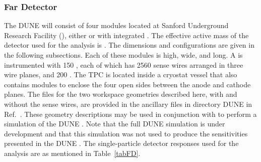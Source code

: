 \subsubsection{Far Detector}
The DUNE %
 will consist of four \nominalmodsize \lartpc modules located at Sanford Underground Research Facility (\surf), %
either  or  with integrated  .  
The effective active mass of the detector used for the analysis is \fdfiducialmass. The  dimensions and   configurations are given in the following subsections.
Each of these modules is \tpcheight high, \cryostatwdth wide, and \cryostatlen long. A \single {} is instrumented with 150 , each of which has 2560 sense wires
arranged in three wire planes, and 200 . The TPC is located inside a cryostat vessel that also contains  modules to enclose the four open sides between the anode and cathode planes. %
The  files for the two   workspace geometries described here, with and without the 
sense wires, are provided in the ancillary files in directory DUNE  in Ref.~\cite{Alion:2016uaj}. These geometry descriptions
may be used in conjunction with  to perform a  simulation of the DUNE . Note that the full DUNE  simulation is under development and that this simulation was not used to produce the sensitivities presented in the DUNE .
The single-particle detector responses used for the analysis are as mentioned in Table~\ref{tabFD}.
\begin{table}[h]
    \begin{center}
        \end{center}
        \caption{\label{tabFD}FD properties used for the analysis }
    \end{table} 
    
